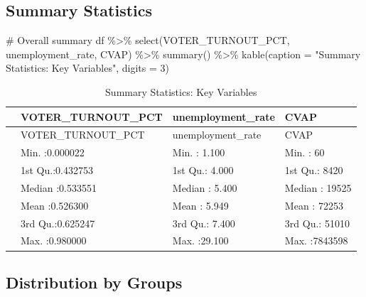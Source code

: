 \documentclass[
  11pt,
]{article}
\newenvironment{Shaded}{\begin{snugshade}}{\end{snugshade}}
\newcommand{\AttributeTok}[1]{\textcolor[rgb]{0.40,0.45,0.13}{#1}}
\newcommand{\CommentTok}[1]{\textcolor[rgb]{0.37,0.37,0.37}{#1}}
\newcommand{\DecValTok}[1]{\textcolor[rgb]{0.68,0.00,0.00}{#1}}
\newcommand{\FunctionTok}[1]{\textcolor[rgb]{0.28,0.35,0.67}{#1}}
\newcommand{\NormalTok}[1]{\textcolor[rgb]{0.00,0.23,0.31}{#1}}
\newcommand{\SpecialCharTok}[1]{\textcolor[rgb]{0.37,0.37,0.37}{#1}}
\newcommand{\StringTok}[1]{\textcolor[rgb]{0.13,0.47,0.30}{#1}}
\begin{document}
\subsection{Summary Statistics}\label{summary-statistics}

\begin{Shaded}
\begin{Highlighting}[]
\CommentTok{\# Overall summary}
\NormalTok{df }\SpecialCharTok{\%\textgreater{}\%}
  \FunctionTok{select}\NormalTok{(VOTER\_TURNOUT\_PCT, unemployment\_rate, CVAP) }\SpecialCharTok{\%\textgreater{}\%}
  \FunctionTok{summary}\NormalTok{() }\SpecialCharTok{\%\textgreater{}\%}
  \FunctionTok{kable}\NormalTok{(}\AttributeTok{caption =} \StringTok{"Summary Statistics: Key Variables"}\NormalTok{, }\AttributeTok{digits =} \DecValTok{3}\NormalTok{)}
\end{Highlighting}
\end{Shaded}

\begin{longtable}[]{@{}llll@{}}
\caption{Summary Statistics: Key Variables}\tabularnewline
\toprule\noalign{}
& VOTER\_TURNOUT\_PCT & unemployment\_rate & CVAP \\
\midrule\noalign{}
\endfirsthead
\toprule\noalign{}
& VOTER\_TURNOUT\_PCT & unemployment\_rate & CVAP \\
\midrule\noalign{}
\endhead
\bottomrule\noalign{}
\endlastfoot
& Min. :0.000022 & Min. : 1.100 & Min. : 60 \\
& 1st Qu.:0.432753 & 1st Qu.: 4.000 & 1st Qu.: 8420 \\
& Median :0.533551 & Median : 5.400 & Median : 19525 \\
& Mean :0.526300 & Mean : 5.949 & Mean : 72253 \\
& 3rd Qu.:0.625247 & 3rd Qu.: 7.400 & 3rd Qu.: 51010 \\
& Max. :0.980000 & Max. :29.100 & Max. :7843598 \\
\end{longtable}

\subsection{Distribution by Groups}\label{distribution-by-groups}
\end{document}
